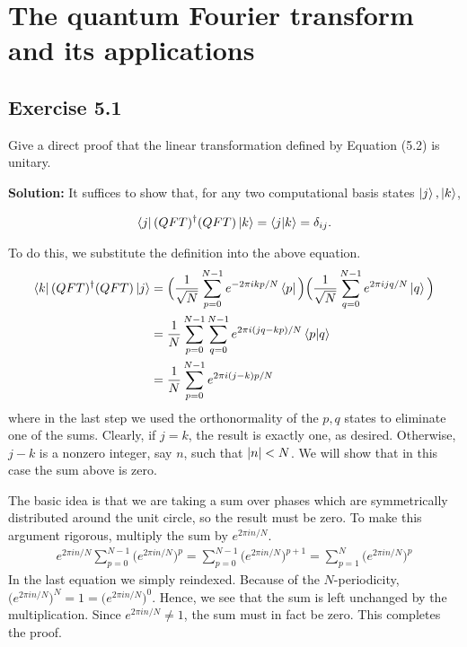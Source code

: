 \documentclass{book}
\begin{document}
\chapter{The quantum Fourier transform and its applications}


\section*{Exercise 5.1}
    Give a direct proof that the linear transformation defined by Equation (5.2) is unitary.
    
    \textbf{Solution:} It suffices to show that, for any two computational basis states $\ket{j}, \ket{k}$,
    
    \begin{align} \label{eq:5.1:QFT_unitary}
        \bra{j}(QFT)^\dagger(QFT)\ket{k} = \braket{j}{k} = \delta_{ij}.
    \end{align}
    
    To do this, we substitute the definition into the above equation. 
    \begin{align} \label{eq:5.1:expand_and_simplify}
    \begin{aligned}
        \bra{k}(QFT)^\dagger(QFT)\ket{j} &= \Big(\frac{1}{\sqrt{N}}\sum_{p=0}^{N-1}e^{-2\pi ikp/N}\bra{p}\Big)\Big(\frac{1}{\sqrt{N}}\sum_{q=0}^{N-1}e^{2\pi ijq/N}\ket{q}\Big) \\
        &= \frac{1}{N}\sum_{p=0}^{N-1}\sum_{q=0}^{N-1}e^{2\pi i(jq-kp)/N}\braket{p}{q} \\
        &= \frac{1}{N}\sum_{p=0}^{N-1} e^{2\pi i (j-k)p/N}
    \end{aligned}
    \end{align}
    where in the last step we used the orthonormality of the $p,q$ states to eliminate one of the sums. Clearly, if $j=k$, the result is exactly one, as desired. Otherwise, $j-k$ is a nonzero integer, say $n$, such that $\abs{n}<N$. We will show that in this case the sum above is zero. 
    
    The basic idea is that we are taking a sum over phases which are symmetrically distributed around the unit circle, so the result must be zero. To make this argument rigorous, multiply the sum by $e^{2\pi i n/N}$.
    \begin{align}
        e^{2\pi i n/N}\sum_{p=0}^{N-1}\big(e^{2\pi i n/N}\big)^p = \sum_{p=0}^{N-1}\big(e^{2\pi i n/N}\big)^{p+1} = \sum_{p=1}^{N}\big(e^{2\pi i n/N}\big)^{p}
    \end{align}
    In the last equation we simply reindexed. Because of the $N$-periodicity, $\big(e^{2\pi i n/N}\big)^N = 1 = \big(e^{2\pi i n/N}\big)^0$. Hence, we see that the sum is left unchanged by the multiplication. Since $e^{2\pi i n/N} \neq 1$, the sum must in fact be zero. This completes the proof.
\end{document}
